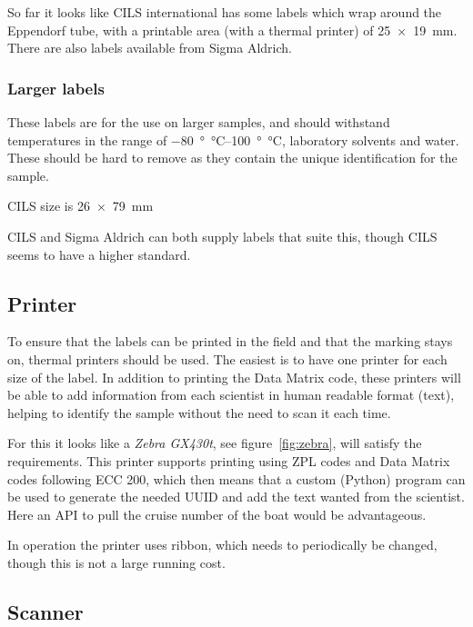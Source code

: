 \documentclass[a4paper,english, 11pt]{article}
\begin{document}
So far it looks like CILS international has some labels which wrap around the Eppendorf tube, with a printable area (with a thermal printer) of \SI{25x19}{\mm}. There are also labels available from Sigma Aldrich.



\subsubsection{Larger labels} %
\label{ssub:Larger labels}
These labels are for the use on larger samples, and should withstand temperatures in the range of \SIrange{-80}{100}{\degree\celsius}, laboratory solvents and water. These should be hard to remove as they contain the unique identification for the sample.

CILS size is \SI{26x79}{\mm}

CILS and Sigma Aldrich can both supply labels that suite this, though CILS seems to have a higher standard.

\subsection{Printer} %
\label{sub:Printer}
To ensure that the labels can be printed in the field and that the marking stays on, thermal printers should be used. The easiest is to have one printer for each size of the label. In addition to printing the Data Matrix code, these printers will be able to add information from each scientist in human readable format (text), helping to identify the sample without the need to scan it each time.

For this it looks like a \emph{Zebra GX430t}, see figure~\ref{fig:zebra}, will satisfy the requirements. This printer supports printing using ZPL codes and Data Matrix codes following ECC 200, which then means that a custom (Python) program can be used to generate the needed UUID and add the text wanted from the scientist. Here an API to pull the cruise number of the boat would be advantageous. 

In operation the printer uses ribbon, which needs to periodically be changed, though this is not a large running cost.
\subsection{Scanner} %
\label{sub:Scanner}
\end{document}
